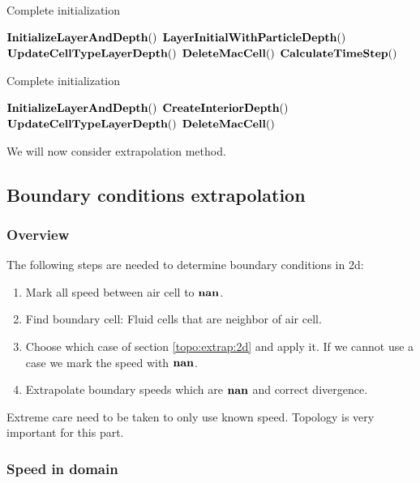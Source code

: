 \begin{algorithm}
\caption{Complete initialization}
\label{code:initialization}
\begin{algorithmic}[1]
\State $\mathop{\textbf{InitializeLayerAndDepth}}()$
\State $\mathop{\textbf{LayerInitialWithParticleDepth}}()$
\State $\mathop{\textbf{UpdateCellTypeLayerDepth}}()$
\State $\mathop{\textbf{DeleteMacCell}}()$
\State $\mathop{\textbf{CalculateTimeStep}}()$
\EndProcedure
\end{algorithmic}
\end{algorithm}

\begin{algorithm}
\caption{Complete initialization}
\label{code:initialization2}
\begin{algorithmic}[1]
\State $\mathop{\textbf{InitializeLayerAndDepth}}()$
\State $\mathop{\textbf{CreateInteriorDepth}}()$
\State $\mathop{\textbf{UpdateCellTypeLayerDepth}}()$
\State $\mathop{\textbf{DeleteMacCell}}()$
\EndProcedure
\end{algorithmic}
\end{algorithm}

We will now consider extrapolation method.

\subsection{Boundary conditions extrapolation}
\subsubsection{Overview}

The following steps are needed to determine boundary conditions in 2d:
\begin{enumerate}
\item  Mark all speed between air cell to $\mathop{\textbf{nan}}$.
 \item Find boundary cell: Fluid cells that are neighbor of air cell.
 \item Choose which case of section \ref{topo:extrap:2d} and apply it. 
 If we cannot use a case we mark the speed with $\mathop{\textbf{nan}}$.
 \item Extrapolate boundary speeds which are $\mathop{\textbf{nan}}$ and correct divergence.
\end{enumerate}
Extreme care need to be taken to only use known speed. Topology is very important for this part.

\subsubsection{Speed in domain}

